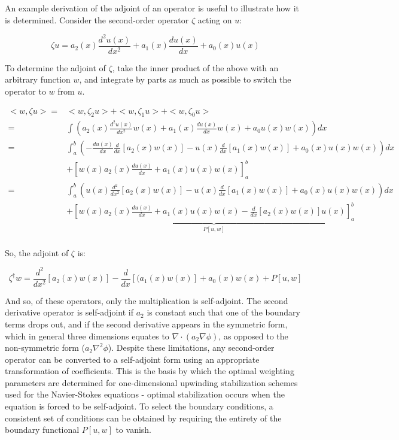 \documentclass[10pt]{article}
\begin{document}
\begin{flushleft}
\begin{tcolorbox}[breakable]
An example derivation of the adjoint of an operator is useful to illustrate how it is determined. Consider the second-order operator \(\zeta\) acting on \(u\):

\begin{equation}
\zeta u=a_2(x)\frac{d^2u(x)}{dx^2}+a_1(x)\frac{du(x)}{dx}+a_0(x)u(x)
\end{equation}

To determine the adjoint of \(\zeta\), take the inner product of the above with an arbitrary function \(w\), and integrate by parts as much as possible to switch the operator to \(w\) from \(u\).

\begin{equation}
\begin{aligned}
<w,\zeta u> = & <w, \zeta_2 u> + <w, \zeta_1 u> + <w, \zeta_0 u>\\
= & \int \left(a_2(x)\frac{d^2u(x)}{dx^2}w(x)+a_1(x)\frac{du(x)}{dx}w(x)+a_0u(x)w(x)\right)dx\\
= & \int_a^b \left(-\frac{du(x)}{dx}\frac{d}{dx}\left\lbrack a_2(x)w(x)\right\rbrack -u(x)\frac{d}{dx}\left\lbrack a_1(x)w(x)\right\rbrack + a_0(x)u(x)w(x)\right) dx\\ 
& + \left\lbrack w(x)a_2(x)\frac{du(x)}{dx}+a_1(x)u(x)w(x)\right\rbrack_a^b\\
= & \int_a^b \left(u(x)\frac{d^2}{dx^2}\left\lbrack a_2(x)w(x)\right\rbrack-u(x)\frac{d}{dx}\left\lbrack a_1(x)w(x)\right\rbrack + a_0(x)u(x)w(x)\right)dx\\
& + \underbrace{\left\lbrack w(x)a_2(x)\frac{du(x)}{dx}+a_1(x)u(x)w(x)-\frac{d}{dx}\left\lbrack a_2(x)w(x)\right\rbrack u(x)\right\rbrack_a^b}_{P[u,w]}\\
\end{aligned}
\end{equation}

So, the adjoint of \(\zeta\) is:

\begin{equation}
\zeta^\dagger w= \frac{d^2}{dx^2}\left\lbrack a_2(x)w(x)\right\rbrack -\frac{d}{dx}\left\lbrack(a_1(x)w(x)\right\rbrack+a_0(x)w(x)+P[u,w]
\end{equation}

And so, of these operators, only the multiplication is self-adjoint. The second derivative operator is self-adjoint if \(a_2\) is constant such that one of the boundary terms drops out, and if the second derivative appears in the symmetric form, which in general three dimensions equates to \(\nabla\cdot(a_2\nabla \phi)\), as opposed to the non-symmetric form (\(a_2\nabla^2 \phi\)). Despite these limitations, any second-order operator can be converted to a self-adjoint form using an appropriate transformation of coefficients. This is the basis by which the optimal weighting parameters are determined for one-dimensional upwinding stabilization schemes used for the Navier-Stokes equations - optimal stabilization occurs when the equation is forced to be self-adjoint. To select the boundary conditions, a consistent set of conditions can be obtained by requiring the entirety of the boundary functional \(P[u,w]\) to vanish. 
\end{tcolorbox}


\end{flushleft}
\end{document}
